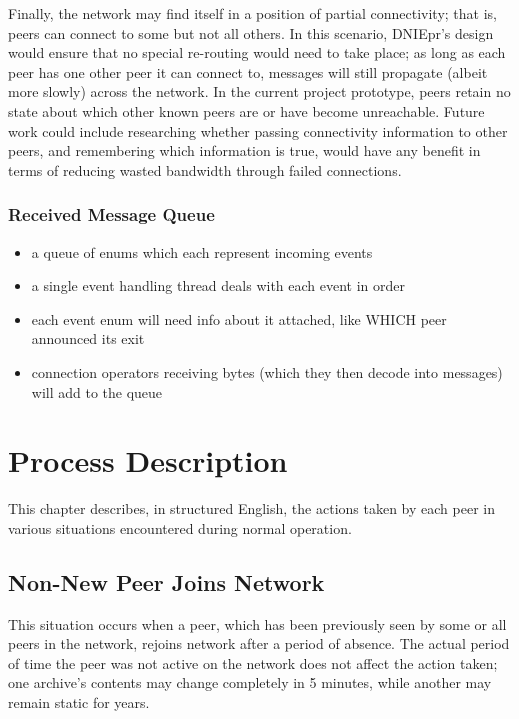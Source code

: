 \documentclass[12pt,a4paper,]{adreport}
\begin{document}
Finally, the network may find itself in a position of partial
connectivity; that is, peers can connect to some but not all others. In
this scenario, DNIEpr's design would ensure that no special re-routing
would need to take place; as long as each peer has one other peer it can
connect to, messages will still propagate (albeit more slowly) across
the network. In the current project prototype, peers retain no state
about which other known peers are or have become unreachable. Future
work could include researching whether passing connectivity information
to other peers, and remembering which information is true, would have
any benefit in terms of reducing wasted bandwidth through failed
connections.

\subsection{Received Message Queue}\label{received-message-queue}

\begin{itemize}
\itemsep1pt\parskip0pt
\item
  a queue of enums which each represent incoming events
\item
  a single event handling thread deals with each event in order
\item
  each event enum will need info about it attached, like WHICH peer
  announced its exit
\item
  connection operators receiving bytes (which they then decode into
  messages) will add to the queue
\end{itemize}

\chapter{Process Description}\label{process-description}

This chapter describes, in structured English, the actions taken by each
peer in various situations encountered during normal operation.

\section{Non-New Peer Joins Network}\label{non-new-peer-joins-network}

This situation occurs when a peer, which has been previously seen by
some or all peers in the network, rejoins network after a period of
absence. The actual period of time the peer was not active on the
network does not affect the action taken; one archive's contents may
change completely in 5 minutes, while another may remain static for
years.
\end{document}

